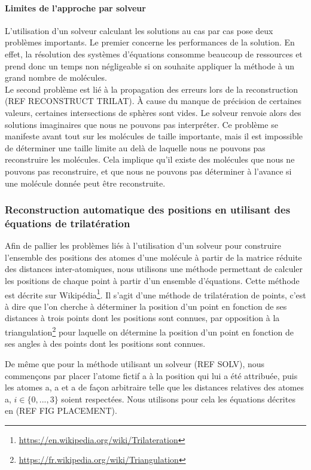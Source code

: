 \paragraph{Limites de l'approche par solveur} L'utilisation d'un solveur calculant les solutions au cas par cas pose deux problèmes importants. Le premier concerne les performances de la solution. En effet, la résolution des systèmes d'équations consomme beaucoup de ressources et prend donc un temps non négligeable si on souhaite appliquer la méthode à un grand nombre de molécules.\\
Le second problème est lié à la propagation des erreurs lors de la reconstruction (REF RECONSTRUCT TRILAT). À cause du manque de précision de certaines valeurs, certaines intersections de sphères sont vides. Le solveur renvoie alors des solutions imaginaires que nous ne pouvons pas interpréter. Ce problème se manifeste avant tout sur les molécules de taille importante, mais il est impossible de déterminer une taille limite au delà de laquelle nous ne pouvons pas reconstruire les molécules. Cela implique qu'il existe des molécules que nous ne pouvons pas reconstruire, et que nous ne pouvons pas déterminer à l'avance si une molécule donnée peut être reconstruite.


\subsubsection{Reconstruction automatique des positions en utilisant des équations de trilatération}

\par Afin de pallier les problèmes liés à l'utilisation d'un solveur pour construire l'ensemble des positions des atomes d'une molécule à partir de la matrice réduite des distances inter-atomiques, nous utilisons une méthode permettant de calculer les positions de chaque point à partir d'un ensemble d'équations. Cette méthode est décrite sur Wikipédia\footnote{\url{https://en.wikipedia.org/wiki/Trilateration}}. Il s'agit d'une méthode de trilatération de points, c'est à dire que l'on cherche à déterminer la position d'un point en fonction de ses distances à trois points dont les positions sont connues, par opposition à la triangulation\footnote{\url{https://fr.wikipedia.org/wiki/Triangulation}} pour laquelle on détermine la position d'un point en fonction de ses angles à des points dont les positions sont connues.\\

\par De même que pour la méthode utilisant un solveur (REF SOLV), nous commençons par placer l'atome fictif a à la position qui lui a été attribuée, puis les atomes a, a et a de façon arbitraire telle que les distances relatives des atomes a, $i \in \{0, ..., 3\}$ soient respectées. Nous utilisons pour cela les équations décrites en (REF FIG PLACEMENT).\\

